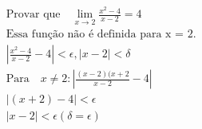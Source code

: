 \begin{ex}
\begin{align}
&\text{Provar que}\quad \lim_{x\rightarrow 2} \frac{x^2-4}{x-2}=4\nonumber\\ 
&\text{Essa função não é definida para x = 2.}\nonumber\\
&\left|\frac{x^2-4}{x-2}-4\right| < \epsilon, \left|x-2\right| < \delta\nonumber\\
&\text{Para} \quad x\neq2 : \left|\frac{(x-2)(x+2}{x-2}-4\right|\nonumber\\
&\left|(x+2)-4\right| < \epsilon\nonumber\\
&\left|x-2\right| < \epsilon  (\delta = \epsilon)\nonumber
\end{align}
\end{ex}